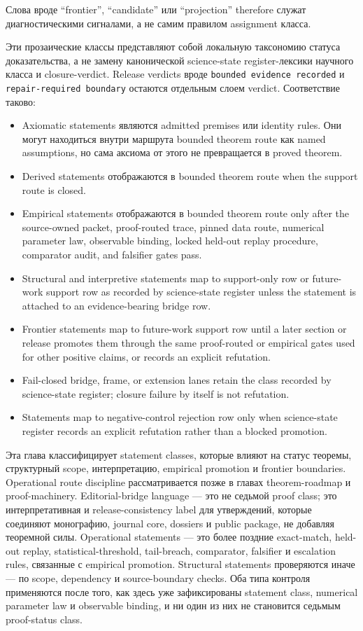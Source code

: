 Слова вроде ``frontier'', ``candidate'' или ``projection'' therefore
служат диагностическими сигналами, а не самим правилом assignment класса.

Эти прозаические классы представляют собой локальную таксономию статуса
доказательства, а не замену канонической science-state register-лексики научного класса и
closure-verdict. Release verdicts вроде \texttt{bounded evidence recorded} и
\texttt{repair-required boundary} остаются отдельным слоем verdict. Соответствие таково:
\begin{itemize}
\item Axiomatic statements являются admitted premises или identity rules. Они
      могут находиться внутри маршрута bounded theorem route как named
      assumptions, но сама аксиома от этого не превращается в proved theorem.
\item Derived statements отображаются в bounded theorem route when the
      support route is closed.
\item Empirical statements отображаются в bounded theorem route only after
      the source-owned packet, proof-routed trace, pinned data route,
      numerical parameter law, observable binding, locked held-out replay
      procedure, comparator audit, and falsifier gates pass.
\item Structural and interpretive statements map to support-only row or
      future-work support row as recorded by science-state register unless the statement is attached
      to an evidence-bearing bridge row.
\item Frontier statements map to future-work support row until a later section or
      release promotes them through the same proof-routed or empirical gates
      used for other positive claims, or records an explicit refutation.
\item Fail-closed bridge, frame, or extension lanes retain the class recorded
      by science-state register; closure failure by itself is not refutation.
\item Statements map to negative-control rejection row only when science-state register records an explicit
      refutation rather than a blocked promotion.
\end{itemize}
Эта глава классифицирует statement classes, которые влияют на статус
теоремы, структурный scope, интерпретацию, empirical promotion и
frontier boundaries.
Operational route discipline рассматривается позже в главах theorem-roadmap и
proof-machinery.
Editorial-bridge language — это не седьмой proof class; это
интерпретативная и release-consistency label для утверждений, которые
соединяют монографию, journal core, dossiers и public package, не добавляя
теоремной силы.
Operational statements — это более поздние exact-match, held-out replay,
statistical-threshold, tail-breach, comparator, falsifier и escalation rules,
связанные с empirical promotion. Structural statements проверяются иначе — по
scope, dependency и source-boundary checks. Оба типа контроля применяются
после того, как здесь уже зафиксированы statement class, numerical parameter
law и observable binding, и ни один из них не становится седьмым proof-status
class.

